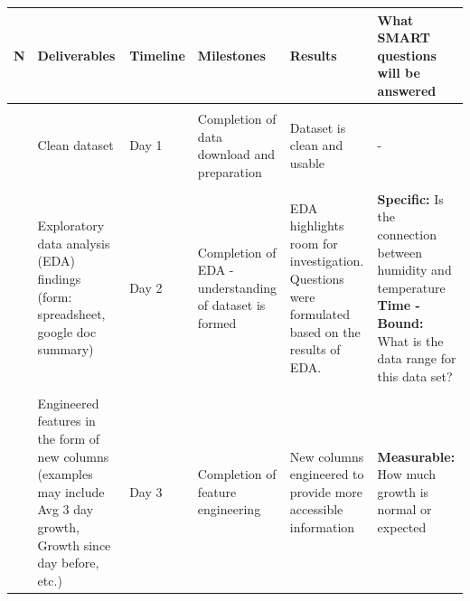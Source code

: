 \documentclass[
]{article}
\begin{document}
\begin{longtable}[]{@{}
  >{\raggedright\arraybackslash}p{}
  >{\raggedright\arraybackslash}p{}
  >{\raggedright\arraybackslash}p{}
  >{\raggedright\arraybackslash}p{}
  >{\raggedright\arraybackslash}p{}
  >{\raggedright\arraybackslash}p{}@{}}
\toprule\noalign{}
\begin{minipage}[b]{\linewidth}\raggedright
N
\end{minipage} & \begin{minipage}[b]{\linewidth}\raggedright
Deliverables
\end{minipage} & \begin{minipage}[b]{\linewidth}\raggedright
Timeline
\end{minipage} & \begin{minipage}[b]{\linewidth}\raggedright
Milestones
\end{minipage} & \begin{minipage}[b]{\linewidth}\raggedright
Results
\end{minipage} & \begin{minipage}[b]{\linewidth}\raggedright
What SMART questions will be answered
\end{minipage} \\
\midrule\noalign{}
\endhead
\bottomrule\noalign{}
\endlastfoot
& & & & & \\
1 & Clean dataset & Day 1 & Completion of data download and preparation
& Dataset is clean and usable & - \\
& & & & & \\
2 & Exploratory data analysis (EDA) findings (form: spreadsheet, google
doc summary) & Day 2 & Completion of EDA - understanding of dataset is
formed & EDA highlights room for investigation. Questions were
formulated based on the results of EDA. & \textbf{Specific:} Is the
connection between humidity and temperature \textbf{Time - Bound:} What
is the data range for this data set? \\
& & & & & \\
3 & Engineered features in the form of new columns (examples may include
Avg 3 day growth, Growth since day before, etc.) & Day 3 & Completion of
feature engineering & New columns engineered to provide more accessible
information & \textbf{Measurable:} How much growth is normal or expected

\end{longtable}
\end{document}
